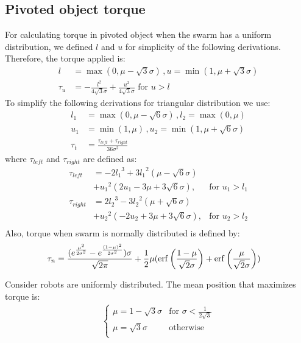 \subsection{Pivoted object torque}
For calculating torque in pivoted object when the swarm has a uniform distribution, we defined $l$ and $u$ for simplicity of the following derivations. Therefore, the torque applied is:
\begin{align}
l &= \max(0,\mu -\sqrt{3} \sigma) \, , u = \min({1,\mu+\sqrt{3}\sigma})\\
\tau_u &= -\frac{l^2}{4\sqrt{3}\sigma}+ \frac{u^2}{4\sqrt{3}\sigma} \textrm{  for    }  u>l
\end{align}
To simplify the following derivations for triangular distribution we use:
\begin{align}
l_1 &= \max({0,\mu-\sqrt{6}\sigma})\, , l_2 = \max({0,\mu})\\ \nonumber
u_1 &= \min({1,\mu})\, , u_2 = \min({1,\mu+\sqrt{6}\sigma})\\ \nonumber
\tau_t &= \frac{\tau_{left} + \tau_{right}}{36\sigma^2}\nonumber
\end{align}
where $\tau_{left}$ and $\tau_{right}$ are defined as:
\begin{align}
\tau_{left} &=  -2{l_1}^3+3{l_1}^2(\mu-\sqrt{6}\sigma)\\ \nonumber
&+{u_1}^2(2u_1 - 3\mu+3\sqrt{6}\sigma), & \textrm{for     } u_1 > l_1\\ \nonumber
\tau_{right} &= 2{l_2}^3-3{l_2}^2(\mu+\sqrt{6}\sigma)\\ \nonumber
&+{u_2}^2(-2u_2 + 3\mu+3\sqrt{6}\sigma),  & \textrm{for     } u_2 > l_2\\ \nonumber
\end{align}
Also, torque when swarm is normally distributed is defined by:
\begin{align} \nonumber
\tau_n &= \frac{(e^{\frac{\mu^2}{2\sigma^2}}-e^{\frac{(1-\mu)^2}{2\sigma^2}})\sigma}{\sqrt{2\pi}}+ \frac{1}{2}\mu(\operatorname{erf}\left(\frac{1-\mu}{\sqrt{2}\sigma}\right)+\operatorname{erf}\left(\frac{\mu}{\sqrt{2}\sigma}\right)) 
\end{align}

Consider robots are uniformly distributed. The mean position that maximizes torque is:
\begin{align}
\left\{
\begin{array}{ll}
\mu = 1-\sqrt{3}\sigma &   \textrm{for     } \sigma < \frac{1}{2\sqrt{3}}\\
\mu = \sqrt{3}\sigma &   \textrm{otherwise}\\
\end{array} 
\right.
\end{align}

